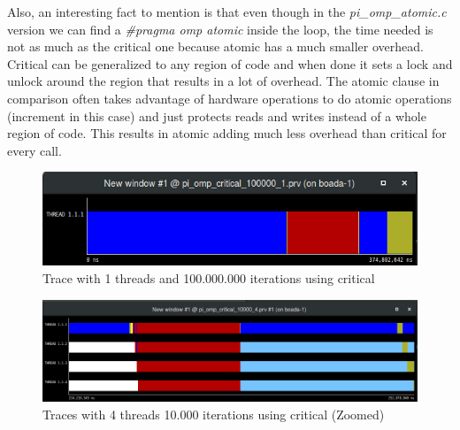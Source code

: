 \documentclass[12]{article}
\begin{document}
Also, an interesting fact to mention is that even though in the \textit{pi\_omp\_atomic.c} version we can find  a \textit{\#pragma omp atomic} inside the loop, the time needed is not as much as the critical one because atomic has a much smaller overhead. Critical can be generalized to any region of code and when done it sets a lock and unlock around the region that results in a lot of overhead. The atomic clause in comparison often takes advantage of hardware operations to do atomic operations (increment in this case) and just protects reads and writes instead of a whole region of code. This results in atomic adding much less overhead than critical for every call.

\begin{figure}[H]
\centering
\includegraphics[scale=0.55]{images/paraverCritical1.png}
\caption{Trace with 1 threads and 100.000.000 iterations using critical}
\label{paraverCritical1}
\end{figure}


\begin{figure}[H]
\centering
\includegraphics[scale=0.35]{images/paraverCritical.png}
\caption{Traces with 4 threads 10.000 iterations using critical (Zoomed)}
\label{paraverCritical}
\end{figure}
\end{document}
